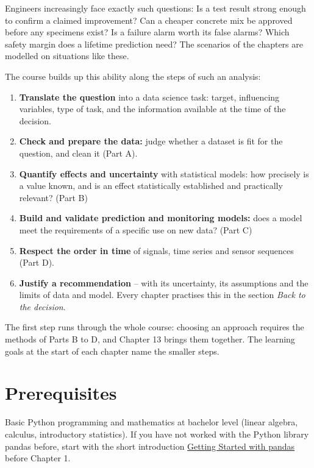 \documentclass[
  letterpaper,
  DIV=11,
  numbers=noendperiod]{scrreprt}
\providecommand{\tightlist}{%
  \setlength{\itemsep}{0pt}\setlength{\parskip}{0pt}}\usepackage{longtable,booktabs,array}
\begin{document}
Engineers increasingly face exactly such questions: Is a test result
strong enough to confirm a claimed improvement? Can a cheaper concrete
mix be approved before any specimens exist? Is a failure alarm worth its
false alarms? Which safety margin does a lifetime prediction need? The
scenarios of the chapters are modelled on situations like these.

The course builds up this ability along the steps of such an analysis:

\begin{enumerate}
\def\labelenumi{\arabic{enumi}.}
\tightlist
\item
  \textbf{Translate the question} into a data science task: target,
  influencing variables, type of task, and the information available at
  the time of the decision.
\item
  \textbf{Check and prepare the data:} judge whether a dataset is fit
  for the question, and clean it (Part A).
\item
  \textbf{Quantify effects and uncertainty} with statistical models: how
  precisely is a value known, and is an effect statistically established
  and practically relevant? (Part B)
\item
  \textbf{Build and validate prediction and monitoring models:} does a
  model meet the requirements of a specific use on new data? (Part C)
\item
  \textbf{Respect the order in time} of signals, time series and sensor
  sequences (Part D).
\item
  \textbf{Justify a recommendation} -- with its uncertainty, its
  assumptions and the limits of data and model. Every chapter practises
  this in the section \emph{Back to the decision}.
\end{enumerate}

The first step runs through the whole course: choosing an approach
requires the methods of Parts B to D, and Chapter 13 brings them
together. The learning goals at the start of each chapter name the
smaller steps.

\section*{Prerequisites}\label{prerequisites}


Basic Python programming and mathematics at bachelor level (linear
algebra, calculus, introductory statistics). If you have not worked with
the Python library pandas before, start with the short introduction
\href{notebooks/00-pandas.ipynb}{Getting Started with pandas} before
Chapter 1.
\end{document}
